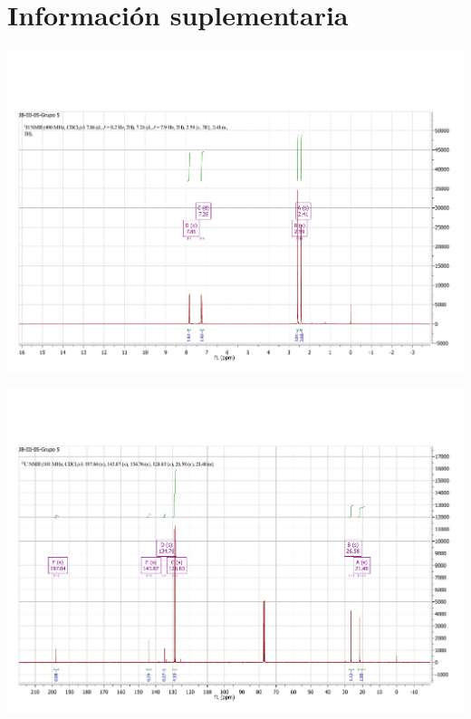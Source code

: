 \documentclass[fleqn,11pt]{SelfArx}
\begin{document}
\onecolumn
\section{Informaci\'on suplementaria}\label{sec: complementaria}

{
	\begin{minipage}{0.9\textheight}
		\centering
		\includegraphics[height=0.7\textheight]{RMN/HRMN.pdf}
		\label{HRMN}
	\end{minipage}
}

{
	\begin{minipage}{\textheight}
		\centering
		\includegraphics[height=0.7\textheight]{RMN/CRMN.pdf}
		\label{CRMN}
	\end{minipage}
}
\end{document}
